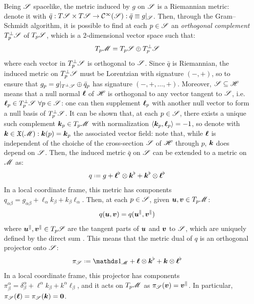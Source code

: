 Being $ \mathscr{S} $ spacelike, the metric induced by $ g $ on $ \mathscr{S} $ is a Riemannian metric: denote it with $ \bar{q} : T \mathscr{S} \times T \mathscr{S} \rightarrow \mathcal{C}^{\infty}(\mathscr{S}) : \bar{q} \equiv g \vert_\mathscr{S} $. Then, through the Gram--Schmidt algorithm, it is possible to find at each $ p \in \mathscr{S} $ an \emph{orthogonal complement} $ T_p^\perp \mathscr{S} $ of $ T_p \mathscr{S} $, which is a $ 2 $-dimensional vector space such that:
\begin{equation}
  T_p\mathscr{M} = T_p \mathscr{S} \oplus T_p^\perp \mathscr{S}
  \label{eq:crs-dir-sum}
\end{equation}
where each vector in $ T_p^\perp \mathscr{S} $ is orthogonal to $ \mathscr{S} $. Since $ \bar{q} $ is Riemannian, the induced metric on $ T_p^\perp \mathscr{S} $ must be Lorentzian with signature $ (-,+) $, so to ensure that $ g_p = g \vert_{T^\perp \mathscr{S}} \oplus \bar{q}_p $ has signature $ (-,+,\dots,+) $. Moreover, $ \mathscr{S} \subseteq \mathscr{H} $ means that a null normal $ \boldsymbol{\ell} $ of $ \mathscr{H} $ is orthogonal to any vector tangent to $ \mathscr{S} $, i.e. $ \boldsymbol{\ell}_p \in T_p^\perp \mathscr{S} \,\, \forall p \in \mathscr{S} $: one can then supplement $ \boldsymbol{\ell}_p $ with another null vector to form a null basis of $ T_p^\perp \mathscr{S} $. It can be shown that, at each $ p \in \mathscr{S} $, there exists a unique such complement $ \boldsymbol{k}_p \in T_p\mathscr{M} $ with normalization $ \braket{\boldsymbol{k}_p , \boldsymbol{\ell}_p} = -1 $, so denote with $ \boldsymbol{k} \in \mathfrak{X}(\mathscr{M}) : \boldsymbol{k}(p) = \boldsymbol{k}_p $ the associated vector field: note that, while $ \boldsymbol{\ell} $ is independent of the choiche of the cross-section $ \mathscr{S} $ of $ \mathscr{H} $ through $ p $, $ \boldsymbol{k} $ does depend on $ \mathscr{S} $. Then, the induced metric $ \bar{q} $ on $ \mathscr{S} $ can be extended to a metric on $ \mathscr{M} $ as:
\begin{equation}
  q \defeq g + \nn^\flat \otimes \kk^\flat + \kk^\flat \otimes \nn^\flat
  \label{eq:crs-metric}
\end{equation}
In a local coordinate frame, this metric has components $ q_{\alpha \beta} = g_{\alpha \beta} + \ell_\alpha k_\beta + k_\beta \ell_\alpha $. Then, at each $ p \in \mathscr{S} $, given $ \boldsymbol{u} , \boldsymbol{v} \in T_p\mathscr{M} $:
\begin{equation}
  q(\boldsymbol{u} , \boldsymbol{v}) = q(\boldsymbol{u}^\parallel , \boldsymbol{v}^\parallel)
\end{equation}
where $ \boldsymbol{u}^\parallel , \boldsymbol{v}^\parallel \in T_p \mathscr{S} $ are the tangent parts of $ \boldsymbol{u} $ and $ \boldsymbol{v} $ to $ \mathscr{S} $, which are uniquely defined by the direct sum . This means that the metric dual of $ q $ is an orthogonal projector onto $ \mathscr{S} $:
\begin{equation}
  \pi_\crs \defeq \id_\man + \nn \otimes \kk^\flat + \kk \otimes \nn^\flat
\end{equation}
In a local coordinate frame, this projector has components $ \pi^\alpha_\beta = \delta^\alpha_\beta + \ell^\alpha k_\beta + k^\alpha \ell_\beta $, and it acts on $ T_p\mathscr{M} $ as $ \pi_\mathscr{S}(\boldsymbol{v}) = \boldsymbol{v}^\parallel $. In particular, $ \pi_\mathscr{S}(\boldsymbol{\ell}) = \pi_\mathscr{S}(\boldsymbol{k}) = \boldsymbol{0} $.

